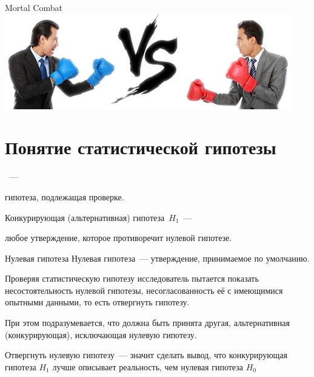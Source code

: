 \documentclass[unicode,11pt,notheorems,xcolor=table]{beamer}
\begin{document}
\begin{frame}{Mortal Combat}{}
\includegraphics[width=\textwidth]{vs.png}

\bigskip
\section{Понятие статистической гипотезы}

\begin{minipage}{5cm}
    ~--- 
    
    гипотеза, подлежащая проверке. 
    
\end{minipage}
\hfill
\begin{minipage}{5cm}
\alert{Конкурирующая (альтернативная) гипотеза}~$H_1$~--- 

любое утверждение, которое противоречит нулевой гипотезе.    
\end{minipage}

\end{frame}


\begin{frame}{Нулевая гипотеза}{}
    Нулевая гипотеза~--- утверждение, принимаемое по умолчанию.

    \vfill

    Проверяя статистическую гипотезу исследователь пытается показать несостоятельность нулевой гипотезы, несогласованность её с имеющимися опытными данными, то есть отвергнуть гипотезу. 

    \vfill

    При этом подразумевается, что должна быть принята другая, альтернативная (конкурирующая), исключающая нулевую гипотезу. 

    \vfill

    Отвергнуть нулевую гипотезу~--- значит сделать вывод, что  \alert{конкурирующая гипотеза $H_1$ лучше описывает реальность, чем нулевая гипотеза $H_0$}
\end{frame}
\end{document}
